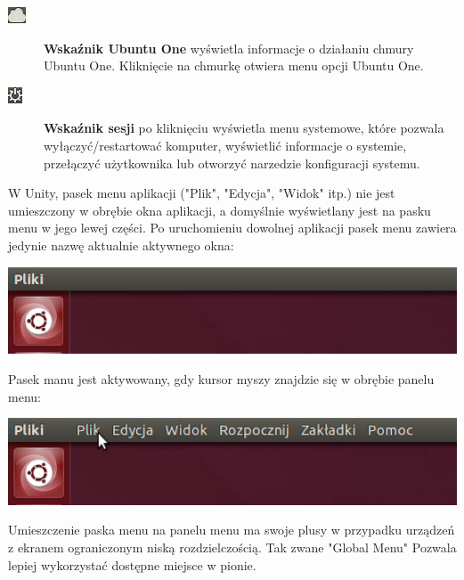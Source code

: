 \begin{description}
\item[\includegraphics{images/unity_wskaznik_chmura.png}]\textbf{Wskaźnik Ubuntu One} wyświetla informacje o działaniu chmury Ubuntu One. Kliknięcie na chmurkę otwiera menu opcji Ubuntu One.
\item[\includegraphics{images/unity_wskaznik_system.png}]\textbf{Wskaźnik sesji} po kliknięciu wyświetla menu systemowe, które pozwala wyłączyć/restartować komputer, wyświetlić informacje o systemie, przełączyć użytkownika lub otworzyć narzedzie konfiguracji systemu.
\end{description}
\clearpage

W Unity, pasek menu aplikacji ("Plik", "Edycja", "Widok" itp.) nie jest umieszczony w obrębie okna aplikacji, a domyślnie wyświetlany jest na pasku menu w jego lewej części. Po uruchomieniu dowolnej aplikacji pasek menu zawiera jedynie nazwę aktualnie aktywnego okna:

\begin{center}
	\includegraphics[scale=0.6]{images/unity_menu_bar2.png}
\end{center}

Pasek manu jest aktywowany, gdy kursor myszy znajdzie się w obrębie panelu menu:

\begin{center}
	\includegraphics[scale=0.6]{images/unity_menu_bar3.png}
\end{center}

Umieszczenie paska menu na panelu menu ma swoje plusy w przypadku urządzeń z ekranem ograniczonym niską rozdzielczością. Tak zwane "Global Menu" Pozwala lepiej wykorzystać dostępne miejsce w pionie.
\clearpage